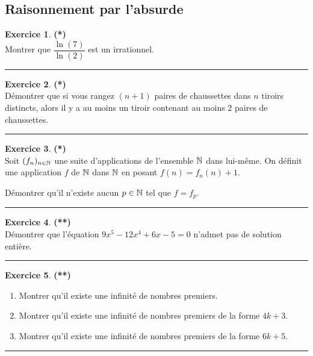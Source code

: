 \documentclass[a4paper,11pt]{article}
\theoremstyle{definition}
\newtheorem{exo}{Exercice} %
\begin{document}
\begin{minipage}{1\linewidth}
	\begin{minipage}[t]{0.48\linewidth}
		\raggedright	
\subsection*{Raisonnement par l'absurde}

\begin{exo}\textbf{(*)}\quad\\[0.2cm]
	Montrer que $\dfrac{\ln(7)}{\ln(2)}$ est un irrationnel. 
	
	\centering
	\rule{1\linewidth}{0.6pt}
\end{exo}

\begin{exo}\textbf{(*)}\quad\\[0.2cm]
Démontrer que si vous rangez $(n+1)$ paires de chaussettes dans $n$ tiroirs distincts, alors il y a au moins un tiroir contenant au moins $2$ paires de chaussettes.

\centering
\rule{1\linewidth}{0.6pt}
\end{exo}

\begin{exo}\textbf{(*)}\quad\\[0.2cm]
	Soit $(f_n)_{n\in\mathbb{N}}$ une suite d'applications de
	l'ensemble $\mathbb{N}$ dans lui-m\^eme. On d\'efinit une application $f$
	de $\mathbb{N}$ dans $\mathbb{N}$ en posant $f(n)=f_n(n)+1$. 
	
	Démontrer qu'il
	n'existe aucun $p\in \mathbb{N}$ tel que $f=f_p$.
	
	\centering
	\rule{1\linewidth}{0.6pt}
\end{exo}

\begin{exo}\textbf{(**)}\quad\\[0.2cm]
	Démontrer que l'équation $9x^5-12x^4+6x-5=0$ n'admet pas de solution entière.
	
	\centering
	\rule{1\linewidth}{0.6pt}
\end{exo}
\begin{exo}\textbf{(**)}\quad\\[0.2cm]
\begin{enumerate}
	\item Montrer qu'il existe une infinité de nombres premiers.
	\item Montrer qu'il existe une infinité de nombres premiers de la forme $4k+3$.
	\item Montrer qu'il existe une infinité de nombres premiers de la forme $6k+5$.
\end{enumerate}
	\centering
\rule{1\linewidth}{0.6pt}
\end{exo}


\end{minipage}
\end{minipage}
\end{document}
